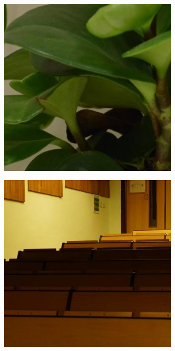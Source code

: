 \begin{figure}
\begin{subfigure}[t]{0.19\textwidth}
    \end{subfigure}
    \hfill
    \begin{subfigure}[t]{0.19\textwidth}
        \centering
        \includegraphics[width=1\textwidth]{images/dataset/NikonD800_6-3_125_5000_plant_1_mean.JPG}
    \end{subfigure}
    \hfill
    \begin{subfigure}[t]{0.19\textwidth}
        \centering
        \includegraphics[width=1\textwidth]{images/dataset/Sony_3-5_200_1600_classroom_14_mean.JPG}

\end{subfigure}
\end{figure}
